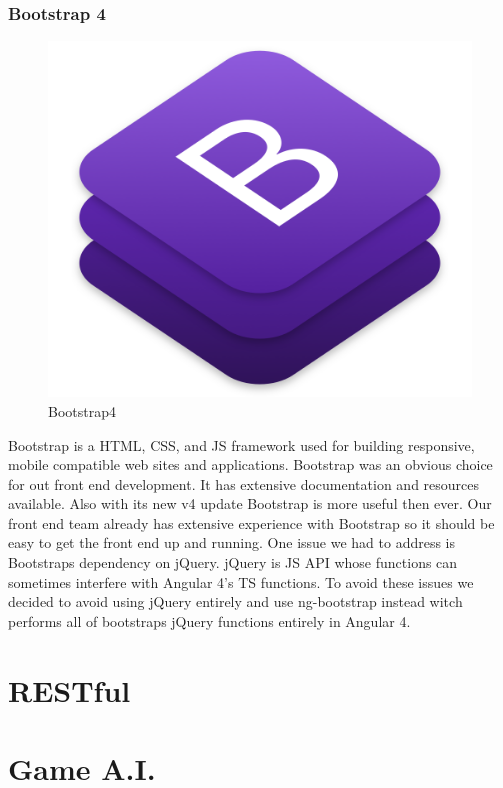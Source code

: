 \documentclass[12pt,a4paper]{report}
\begin{document}
			\subsubsection{Bootstrap 4}
			\begin{figure}
				\includegraphics[scale=0.1]{bootstrap4}
				\caption{Bootstrap4}
				\label{Bootstrap 4}
			\end{figure}
			Bootstrap is a HTML, CSS, and JS framework used for building responsive, mobile compatible web sites and applications. Bootstrap was an obvious choice for out front end development. It has extensive documentation and resources available. Also with its new v4 update Bootstrap is more useful then ever. Our front end team already has extensive experience with Bootstrap so it should be easy to get the front end up and running. One issue we had to address is Bootstraps dependency on jQuery. jQuery is JS API whose functions can sometimes interfere with Angular 4's TS functions. To avoid these issues we decided to avoid using jQuery entirely and use ng-bootstrap instead witch performs all of bootstraps jQuery functions entirely in Angular 4.
			
			
	\section{RESTful}
	\section{Game A.I.}
\end{document}
